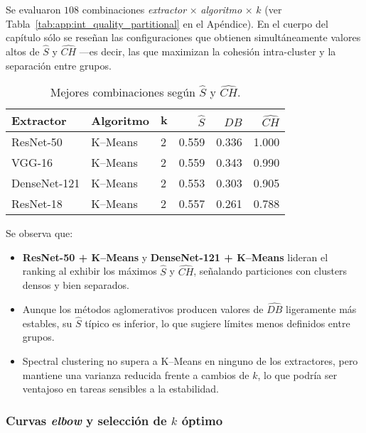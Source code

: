 \label{ssec:int_quality_partitional}

Se evaluaron \(108\) combinaciones
\textit{extractor} × \textit{algoritmo} × \(k\) (ver
Tabla~\ref{tab:app:int_quality_partitional} en el Apéndice).
En el cuerpo del capítulo sólo se reseñan las configuraciones que
obtienen simultáneamente valores altos de \(\widehat S\) y
\(\widehat{CH}\) —es decir, las que maximizan la cohesión intra-cluster
y la separación entre grupos.

\begin{table}[ht]
  \centering
  \caption{Mejores combinaciones según \(\widehat S\) y \(\widehat{CH}\).}
  \label{tab:int_quality_top}
  \begin{tabular}{lllrrr}
    \hline
    \textbf{Extractor} & \textbf{Algoritmo} & \(\mathbf{k}\)
      & \(\widehat S\) & \(\widehat{DB}\) & \(\widehat{CH}\) \\
    \hline
    ResNet-50    & K–Means & 2 & 0.559 & 0.336 & 1.000 \\
    VGG-16       & K–Means & 2 & 0.559 & 0.343 & 0.990 \\
    DenseNet-121 & K–Means & 2 & 0.553 & 0.303 & 0.905 \\
    ResNet-18    & K–Means & 2 & 0.557 & 0.261 & 0.788 \\
    \hline
  \end{tabular}
\end{table}

Se observa que:

\begin{itemize}
  \item \textbf{ResNet-50 + K–Means} y \textbf{DenseNet-121 + K–Means}
        lideran el ranking al exhibir los máximos
        \(\widehat S\) y \(\widehat{CH}\), señalando particiones con
        clusters densos y bien separados.
  \item Aunque los métodos aglomerativos producen valores de
        \(\widehat{DB}\) ligeramente más estables,
        su \(\widehat S\) típico es inferior,
        lo que sugiere límites menos definidos entre grupos.
  \item Spectral clustering no supera a K–Means en ninguno de los
        extractores, pero mantiene una varianza reducida frente a cambios
        de \(k\), lo que podría ser ventajoso en tareas sensibles a la
        estabilidad.
\end{itemize}

\subsubsection{Curvas \emph{elbow} y selección de $k$ óptimo}


